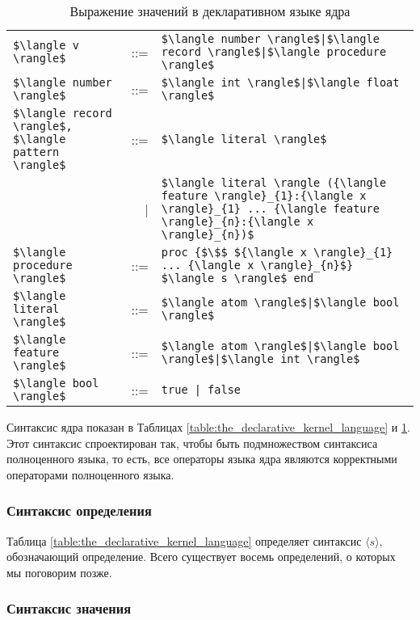 \begin{table}
  \begin{tabular}{|lrl|}
    \hline
    \lstinline|$\langle v \rangle$| & ::= & \lstinline!$\langle number \rangle$|$\langle record \rangle$|$\langle procedure \rangle$!\\
    \lstinline|$\langle number \rangle$| & ::= & \lstinline!$\langle int \rangle$|$\langle float \rangle$!\\
    \lstinline|$\langle record \rangle$, $\langle pattern \rangle$| & ::= & \lstinline!$\langle literal \rangle$!\\
    \lstinline| | & | & \lstinline!$\langle literal \rangle ({\langle feature \rangle}_{1}:{\langle x \rangle}_{1} ... {\langle feature \rangle}_{n}:{\langle x \rangle}_{n})$!\\
    \lstinline|$\langle procedure \rangle$| & ::= & \lstinline!proc {$\$$ ${\langle x \rangle}_{1} ... {\langle x \rangle}_{n}$} $\langle s \rangle$ end!\\
    \lstinline|$\langle literal \rangle$| & ::= & \lstinline!$\langle atom \rangle$|$\langle bool \rangle$!\\
    \lstinline|$\langle feature \rangle$| & ::= & \lstinline!$\langle atom \rangle$|$\langle bool \rangle$|$\langle int \rangle$!\\
    \lstinline|$\langle bool \rangle$| & ::= & \lstinline!true | false!\\
    \hline
  \end{tabular}
  
\caption{Выражение значений в декларативном языке ядра}
\label{table:value_expressions_kernel_language}
\end{table}

Синтаксис ядра показан в Таблицах \ref{table:the_declarative_kernel_language} и \ref{table:value_expressions_kernel_language}. Этот синтаксис спроектирован так, чтобы быть подмножеством синтаксиса полноценного языка, то есть, все операторы языка ядра являются корректными операторами полноценного языка.

\subsubsection{Синтаксис определения}

Таблица \ref{table:the_declarative_kernel_language} определяет синтаксис $\langle s \rangle$, обозначающий определение. Всего существует восемь определений, о которых мы поговорим позже.

\subsubsection{Синтаксис значения}


